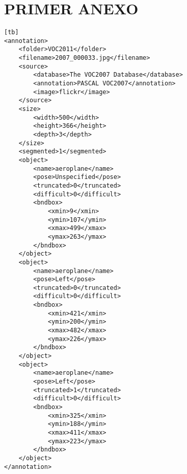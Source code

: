 
\chapter{PRIMER ANEXO}
\label{ch:capIVA}

\begin{lstlisting}[frame=single][tb]
<annotation>
	<folder>VOC2011</folder>
	<filename>2007_000033.jpg</filename>
	<source>
		<database>The VOC2007 Database</database>
		<annotation>PASCAL VOC2007</annotation>
		<image>flickr</image>
	</source>
	<size>
		<width>500</width>
		<height>366</height>
		<depth>3</depth>
	</size>
	<segmented>1</segmented>
	<object>
		<name>aeroplane</name>
		<pose>Unspecified</pose>
		<truncated>0</truncated>
		<difficult>0</difficult>
		<bndbox>
			<xmin>9</xmin>
			<ymin>107</ymin>
			<xmax>499</xmax>
			<ymax>263</ymax>
		</bndbox>
	</object>
	<object>
		<name>aeroplane</name>
		<pose>Left</pose>
		<truncated>0</truncated>
		<difficult>0</difficult>
		<bndbox>
			<xmin>421</xmin>
			<ymin>200</ymin>
			<xmax>482</xmax>
			<ymax>226</ymax>
		</bndbox>
	</object>
	<object>
		<name>aeroplane</name>
		<pose>Left</pose>
		<truncated>1</truncated>
		<difficult>0</difficult>
		<bndbox>
			<xmin>325</xmin>
			<ymin>188</ymin>
			<xmax>411</xmax>
			<ymax>223</ymax>
		</bndbox>
	</object>
</annotation>

\end{lstlisting}


%
%


